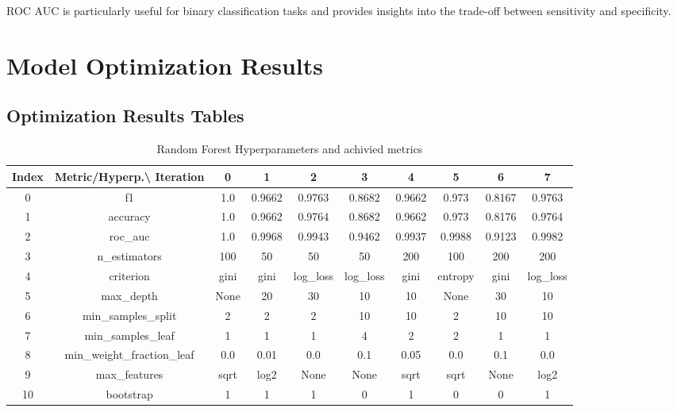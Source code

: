 \documentclass{article}%
\begin{document}
                ROC AUC is particularly useful for binary classification tasks and provides insights into the trade-off between sensitivity and specificity.
                

%
\newpage%
\section{Model Optimization Results}%
\label{sec:ModelOptimizationResults}%
\subsection{Optimization Results Tables}%
\label{subsec:OptimizationResultsTables}%


\begin{table}[h!]%
\caption{Random Forest Hyperparameters and achivied metrics}%
\vspace{0.2cm}%
\centering%
\begin{tabular}{|c||c||c||c||c||c||c||c||c||c|}%
\hline%
Index&Metric/Hyperp.\textbackslash{} Iteration&0&1&2&3&4&5&6&7\\%
\hline%
0&f1&1.0&0.9662&0.9763&0.8682&0.9662&0.973&0.8167&0.9763\\%
1&accuracy&1.0&0.9662&0.9764&0.8682&0.9662&0.973&0.8176&0.9764\\%
2&roc\_auc&1.0&0.9968&0.9943&0.9462&0.9937&0.9988&0.9123&0.9982\\%
3&n\_estimators&100&50&50&50&200&100&200&200\\%
4&criterion&gini&gini&log\_loss&log\_loss&gini&entropy&gini&log\_loss\\%
5&max\_depth&None&20&30&10&10&None&30&10\\%
6&min\_samples\_split&2&2&2&10&10&2&10&10\\%
7&min\_samples\_leaf&1&1&1&4&2&2&1&1\\%
8&min\_weight\_fraction\_leaf&0.0&0.01&0.0&0.1&0.05&0.0&0.1&0.0\\%
9&max\_features&sqrt&log2&None&None&sqrt&sqrt&None&log2\\%
10&bootstrap&1&1&1&0&1&0&0&1\\%
\hline%
\end{tabular}%
\end{table}

%
\end{document}
